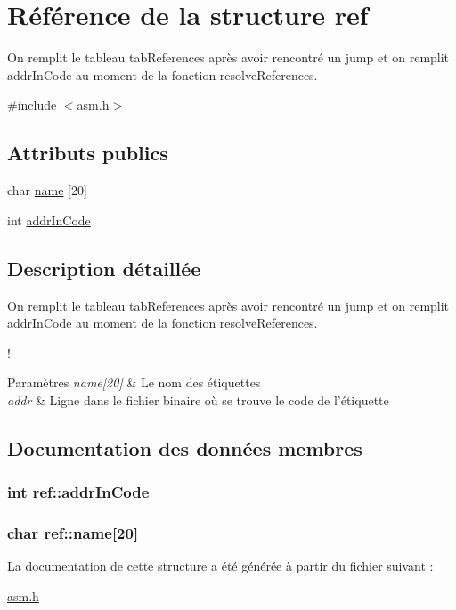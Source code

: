 \hypertarget{structref}{\section{Référence de la structure ref}
\label{structref}
}


On remplit le tableau tab\-References après avoir rencontré un jump et on remplit addr\-In\-Code au moment de la fonction resolve\-References.  




{\ttfamily \#include $<$asm.\-h$>$}

\subsection*{Attributs publics}
\begin{DoxyCompactItemize}
\item 
char \hyperlink{structref_a7cd82e39ce031589cbc85b4c5666fb3a}{name} \mbox{[}20\mbox{]}
\item 
int \hyperlink{structref_aab92a178c6f40703ef8a5a18cc2ba81d}{addr\-In\-Code}
\end{DoxyCompactItemize}


\subsection{Description détaillée}
On remplit le tableau tab\-References après avoir rencontré un jump et on remplit addr\-In\-Code au moment de la fonction resolve\-References. 

! 
\begin{DoxyParams}{Paramètres}
{\em name\mbox{[}20\mbox{]}} & Le nom des étiquettes \\
\hline
{\em addr} & Ligne dans le fichier binaire où se trouve le code de l'étiquette \\
\hline
\end{DoxyParams}


\subsection{Documentation des données membres}
\hypertarget{structref_aab92a178c6f40703ef8a5a18cc2ba81d}{
\subsubsection[{addr\-In\-Code}]{\setlength{\rightskip}{0pt plus 5cm}int ref\-::addr\-In\-Code}}\label{structref_aab92a178c6f40703ef8a5a18cc2ba81d}
\hypertarget{structref_a7cd82e39ce031589cbc85b4c5666fb3a}{
\subsubsection[{name}]{\setlength{\rightskip}{0pt plus 5cm}char ref\-::name\mbox{[}20\mbox{]}}}\label{structref_a7cd82e39ce031589cbc85b4c5666fb3a}


La documentation de cette structure a été générée à partir du fichier suivant \-:\begin{DoxyCompactItemize}
\item 
\hyperlink{asm_8h}{asm.\-h}\end{DoxyCompactItemize}
